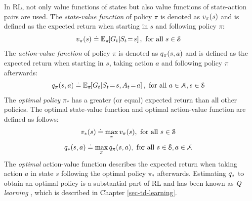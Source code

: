 \documentclass[a4paper, 12pt]{article}
\let\cite\shortcite
\begin{document}
In RL, not only value functions of states but also value functions of
state-action pairs are used. The \emph{state-value function} of policy \(\pi\) is
denoted as \(v_\pi(s)\) and is defined as the expected return when starting in \(s\)
and following policy \(\pi\):
\begin{equation}
    v_\pi(s) \doteq \mathbb{E}_{\pi\!\!}\left[G_t|S_t\!=\!s\right], \text{ for all } s\in{\cal S}
\end{equation}
The \emph{action-value function} of policy \(\pi\) is denoted as \(q_\pi(s,a)\) and is
defined as the expected return when starting in \(s\), taking action \(a\) and
following policy \(\pi\) afterwards:
\begin{equation}
    q_\pi(s,a) \doteq \mathbb{E}_{\pi\!\!}\left[G_t|S_t\!=\!s, A_t\!=\!a\right], \text{ for all } a\in{\cal A}, s\in{\cal S}
\end{equation}
The \emph{optimal policy} \(\pi_*\) has a greater (or equal) expected return than all
other policies. The optimal state-value function and optimal action-value
function are defined as follows:
\begin{equation}
    v_*(s) \doteq \max_{\pi} v_\pi(s), \text{ for all } s\in{\cal S}
\end{equation}
\begin{equation}
    q_*(s,a) \doteq \max_{\pi} q_\pi(s,a), \text{ for all } s\in{\cal S}, a\in{\cal A}
\end{equation}
The \emph{optimal} action-value function describes the expected return when taking
action \(a\) in state \(s\) following the optimal policy \(\pi_*\) afterwards.
Estimating \(q_*\) to obtain an optimal policy is a substantial part of RL and
has been known as \emph{Q-learning} \cite{watkins92_q_learn}, which is described in
Chapter \ref{sec-td-learning}.
\end{document}
